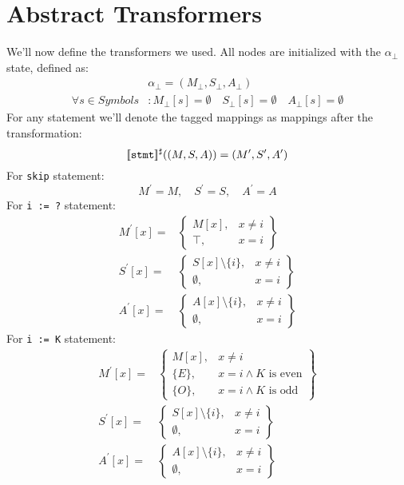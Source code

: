 \section*{Abstract Transformers}
We'll now define the transformers we used. All nodes are initialized with the $\alpha_\bot$ state, defined as:
\begin{align*}
	&\alpha_\bot=(M_\bot, S_\bot, A_\bot) \\
	\forall s \in Symbols&:
	M_\bot[s] =\emptyset  \quad
	S_\bot[s] =\emptyset \quad
	A_\bot[s] =\emptyset
\end{align*}
For any statement we'll denote the tagged mappings as mappings after the transformation:
\begin{equation*}
	[\![\texttt{stmt}]\!]^\sharp((M, S, A)) = (M^\prime,S^\prime,A^\prime)
\end{equation*}
For \texttt{skip} statement:
\begin{equation*}
	M^\prime = M, \quad S^\prime = S, \quad A^\prime = A
\end{equation*}
For \texttt{i := ?} statement:
\begin{align*}
M^\prime[x] = & \left.
	\begin{cases}
		M[x], & x\ne i \\
		\top, & x = i
	\end{cases}
\right\}\\
S^\prime[x] = & \left.
	\begin{cases}
		S[x] \setminus \{i\}, & x\ne i \\
		\emptyset, & x = i
	\end{cases}
\right\}\\
A^\prime[x] = & \left.
\begin{cases}
	A[x] \setminus \{i\}, & x\ne i \\
	\emptyset, & x = i
\end{cases}
\right\}
\end{align*}
For \texttt{i := K} statement:
\begin{align*}
M^\prime[x] = & \left.
	\begin{cases}
		M[x], & x\ne i \\
		\{E\}, & x = i \wedge K \text{ is even} \\
		\{O\}, & x = i \wedge K \text{ is odd}
	\end{cases}
\right\}\\
S^\prime[x] = & \left.
	\begin{cases}
		S[x] \setminus \{i\}, & x\ne i \\
		\emptyset, & x = i
	\end{cases}
\right\}\\
A^\prime[x] = & \left.
\begin{cases}
	A[x] \setminus \{i\}, & x\ne i \\
	\emptyset, & x = i
\end{cases}
\right\}
\end{align*}

